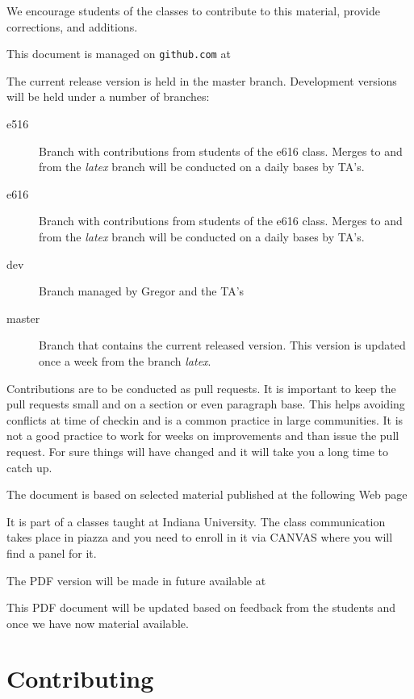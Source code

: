 We encourage students of the classes to contribute to this material,
provide corrections, and additions.

This document is managed on \verb|github.com| at 


The current release version is held in the master branch.
Development versions will be held under a number of branches:

\begin{description}
\item[e516] Branch with contributions from students of the e616
  class. Merges to and from the {\em latex} branch will be conducted
  on a daily bases by TA's.
\item[e616] Branch with contributions from students of the e616
  class. Merges to and from the {\em latex} branch will be conducted
  on a daily bases by TA's.
\item[dev] Branch managed by Gregor and the TA's
\item[master] Branch that contains the current released version. This
  version is updated once a week from the branch {\em latex}.
\end{description}

Contributions are to be conducted as pull requests. It is important to
keep the pull requests small and on a section or even paragraph
base. This helps avoiding conflicts at time of checkin and is a common
practice in large communities. It is not a good practice to work for
weeks on improvements and than issue the pull request. For sure things
will have changed and it will take you a long time to catch up.

The document is based on selected material published at the following
Web page


It is part of a classes taught at Indiana University. The class
communication takes place in piazza and you need to enroll in it via
CANVAS where you will find a panel for it.

The PDF version will be made in future available at 


This PDF document will be updated based on feedback from the students
and once we have now material available. 

\section{Contributing}

